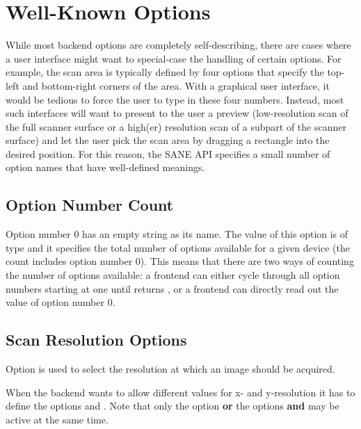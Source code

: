 \documentclass[11pt,DVIps]{report}
\begin{document}
\section{Well-Known Options}

While most backend options are completely self-describing, there are
cases where a user interface might want to special-case the handling
of certain options.  For example, the scan area is typically defined
by four options that specify the top-left and bottom-right corners of
the area.  With a graphical user interface, it would be tedious to
force the user to type in these four numbers.  Instead, most such
interfaces will want to present to the user a preview (low-resolution
scan of the full scanner surface or a high(er) resolution scan of a subpart
of the scanner surface) and let the user pick the scan area by
dragging a rectangle into the desired position.  For this reason, the
SANE API specifies a small number of option names that have
well-defined meanings.

\subsection{Option Number Count}

Option number 0 has an empty string as its name.  The value of this
option is of type  and it specifies the total
number of options available for a given device (the count includes
option number 0).  This means that there are two ways of counting the
number of options available: a frontend can either cycle through all
option numbers starting at one until
 returns , or a
frontend can directly read out the value of option number 0.

\subsection{Scan Resolution Options}

Option  is used to select the resolution at which an
image should be acquired.
\begin{changebar}
When the backend wants to allow different
values for x- and y-resolution it has to define the options
 and . Note that only
the option  {\bf or} the options
 {\bf and}  may be active at the
same time.
\end{changebar}
\end{document}
